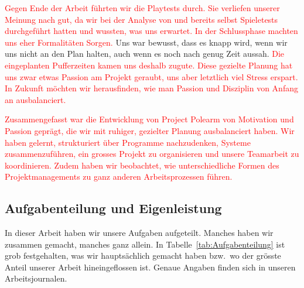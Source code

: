 \documentclass[../Main.tex]{subfiles}
\begin{document}
\textcolor{red}{Gegen Ende der Arbeit führten wir die Playtests durch. Sie verliefen unserer Meinung nach gut, da wir bei der Analyse von  und  bereits selbst Spieletests durchgeführt hatten und wussten, was uns erwartet. In der Schlussphase machten uns eher Formalitäten Sorgen.} Uns war bewusst, dass es knapp wird, wenn wir uns nicht an den Plan halten, auch wenn es noch nach genug Zeit aussah. \textcolor{red}{Die eingeplanten Pufferzeiten kamen uns deshalb zugute. Diese gezielte Planung hat uns zwar etwas Passion am Projekt geraubt, uns aber letztlich viel Stress erspart. In Zukunft möchten wir herausfinden, wie man Passion und Disziplin von Anfang an ausbalanciert.}

\textcolor{red}{Zusammengefasst war die Entwicklung von Project Polearm von Motivation und Passion geprägt, die wir mit ruhiger, gezielter Planung ausbalanciert haben. Wir haben gelernt, strukturiert über Programme nachzudenken, Systeme zusammenzuführen, ein grosses Projekt zu organisieren und unsere Teamarbeit zu koordinieren. Zudem haben wir beobachtet, wie unterschiedliche Formen des Projektmanagements zu ganz anderen Arbeitsprozessen führen.}

\subsection{Aufgabenteilung und Eigenleistung} \label{sec:Aufgabenteilung}

In dieser Arbeit haben wir unsere Aufgaben aufgeteilt. Manches haben wir zusammen gemacht, manches ganz allein. In Tabelle~\ref{tab:Aufgabenteilung} ist grob festgehalten, was wir hauptsächlich gemacht haben bzw.\ wo der grösste Anteil unserer Arbeit hineingeflossen ist. Genaue Angaben finden sich in unseren Arbeitsjournalen.
\end{document}
